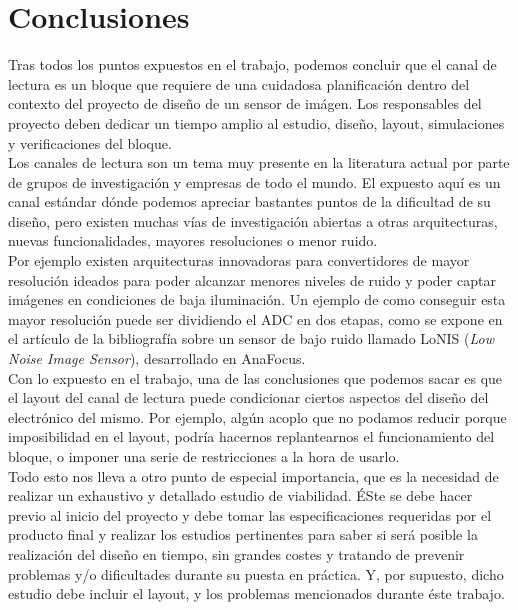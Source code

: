 \chapter{Conclusiones}

Tras todos los puntos expuestos en el trabajo, podemos concluir que el canal de
lectura es un bloque que requiere de una cuidadosa planificación dentro del
contexto del proyecto de diseño de un sensor de imágen. Los responsables del
proyecto deben dedicar un tiempo amplio al estudio, diseño, layout, simulaciones
y verificaciones del bloque.\\

Los canales de lectura son un tema muy presente en la literatura actual por parte
de grupos de investigación y empresas de todo el mundo. El expuesto aquí es un
canal estándar dónde podemos apreciar bastantes puntos de la dificultad de su
diseño, pero existen muchas vías de investigación abiertas a otras arquitecturas,
nuevas funcionalidades, mayores resoluciones o menor ruido.\\

Por ejemplo existen arquitecturas innovadoras para convertidores de mayor resolución
ideados para poder alcanzar menores niveles de ruido y poder captar imágenes en
condiciones de baja iluminación. Un ejemplo de como conseguir esta mayor resolución
puede ser dividiendo el ADC en dos etapas, como se expone en el artículo de la
bibliografía\cite{Gonzalez-Charlet2015:Low_noise} sobre un sensor de bajo ruido
llamado LoNIS (\textit{Low Noise Image Sensor}), desarrollado en AnaFocus\cite{anafocus}.\\

Con lo expuesto en el trabajo, una de las conclusiones que podemos sacar es que
el layout del canal de lectura puede condicionar ciertos aspectos del diseño del
electrónico del mismo. Por ejemplo, algún acoplo que no podamos reducir porque
imposibilidad en el layout, podría hacernos replantearnos el funcionamiento
del bloque, o imponer una serie de restricciones a la hora de usarlo.\\

Todo esto nos lleva a otro punto de especial importancia, que es la necesidad de
realizar un exhaustivo y detallado estudio de viabilidad. ÉSte se debe hacer
previo al inicio del proyecto y debe tomar las especificaciones requeridas por el
producto final y realizar los estudios pertinentes para saber si será posible la
realización del diseño en tiempo, sin grandes costes y tratando de prevenir problemas
y/o dificultades durante su puesta en práctica. Y, por supuesto, dicho estudio debe
incluir el layout, y los problemas mencionados durante éste trabajo.\\

